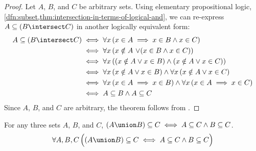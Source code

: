 \begin{proof}
    Let \( A \), \( B \), and \( C \) be arbitrary sets. Using elementary propositional logic, \cref{dfn:subset,thm:intersection-in-terms-of-logical-and},
    we can re-express \( A \subseteq \mleft( B \intersect C \mright) \) in another logically equivalent form:
    \begin{align*}
        A \subseteq \mleft( B \intersect C \mright)
        &\iff
        \forall x \, \mleft( x \in A \implies x \in B \land x \in C \mright)\\
        &\iff
        \forall x \, \mleft( x \notin A \,\,{\lor} \mleft( x \in B \land x \in C \mright) \mright)\\
        &\iff
        \forall x \, \mleft( \mleft( x \notin A \lor x \in B \mright)
        \land \mleft( x \notin A \lor x \in C \mright) \mright)\\
        &\iff
        \forall x \, \mleft( x \notin A \lor x \in B \mright)
        \land
        \forall x \, \mleft( x \notin A \lor x \in C \mright)\\
        &\iff
        \forall x \, \mleft( x \in A \implies x \in B \mright)
        \land
        \forall x \, \mleft( x \in A \implies x \in C \mright)\\
        &\iff
        A \subseteq B \land A \subseteq C
    \end{align*}
    Since \( A \), \( B \), and \( C \) are arbitrary, the theorem follows from .
\end{proof}

\begin{thm}
    \label{set-identities:right-distributivity-of-subset-relation-over-union}
    For any three sets \( A \), \( B \), and \( C \), \( \mleft( A \union B \mright) \subseteq C
    \iff A \subseteq C \land B \subseteq C\).
    \begin{equation*}
        \forall A,B,C \, \Big( \mleft( A \union B \mright) \subseteq C \iff
        A \subseteq C \land B \subseteq C \Big)
    \end{equation*}
\end{thm}

